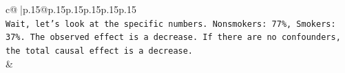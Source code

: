 \documentclass{article}
\begin{document}
{\begin{supertabular}{c@{$\;$}|p{.15\linewidth}@{}p{.15\linewidth}p{.15\linewidth}p{.15\linewidth}p{.15\linewidth}p{.15\linewidth}}
{{{\\ 
\texttt{Wait, let's look at the specific numbers. Nonsmokers: 77\%, Smokers: 37\%. The observed effect is a decrease. If there are no confounders, the total causal effect is a decrease.} \\
            }
        }
    }
    & \\ \\

\end{supertabular}
}
\end{document}
